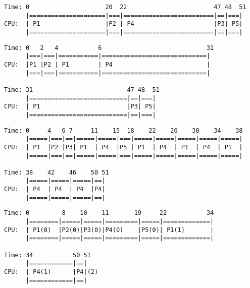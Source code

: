 \documentclass[12pt]{article}
\begin{document}
\begin{lstlisting}[style=ganttstyle, caption={Gantt Chart: Priority - Non-Preemptive (burst\_mix.txt)}, label={lst:gantt_prio_np_burstmix}]
Time: 0                     20  22                        47 48  51
      |=====================|===|=========================|==|===|
CPU:  | P1                  |P2 | P4                      |P3| P5|
      |=====================|===|=========================|==|===|
\end{lstlisting}

\begin{lstlisting}[style=ganttstyle, breaklines=false, caption={Gantt Chart: Priority - Preemptive (burst\_mix.txt)}, label={lst:gantt_prio_p_burstmix}]
Time: 0   2   4           6                             31
      |===|===|===========|=============================|
CPU:  |P1 |P2 | P1        | P4                          |
      |===|===|===========|=============================|
      
Time: 31                          47 48  51
      |===========================|==|===|
CPU:  | P1                        |P3| P5|
      |===========================|==|===|
\end{lstlisting}

\begin{lstlisting}[style=ganttstyle, breaklines=false, caption={Gantt Chart: Round Robin, Q=4 (burst\_mix.txt)}, label={lst:gantt_rr_burstmix}]
Time: 0     4   6 7     11    15  18    22    26    30    34    38
      |=====|===|==|=====|=====|===|=====|=====|=====|=====|=====|
CPU:  | P1  |P2 |P3| P1  | P4  |P5 | P1  | P4  | P1  | P4  | P1  |
      |=====|===|==|=====|=====|===|=====|=====|=====|=====|=====|

Time: 38    42    46    50 51
      |=====|=====|=====|==|
CPU:  | P4  | P4  | P4  |P4|
      |=====|=====|=====|==|
\end{lstlisting}

\begin{lstlisting}[style=ganttstyle, breaklines=false, caption={Gantt Chart: MLFQ (burst\_mix.txt) Queue number in parenthesis}, label={lst:gantt_mlfq_burstmix}]
Time: 0         8    10    11       19     22           34 
      |========|=====|=====|=========|=====|=============|
CPU:  | P1(0)  |P2(0)|P3(0)|P4(0)    |P5(0)| P1(1)       |
      |========|=====|=====|=========|=====|=============|

Time: 34           50 51
      |============|==|
CPU:  | P4(1)      |P4|(2)
      |============|==|
\end{lstlisting}
\end{document}
